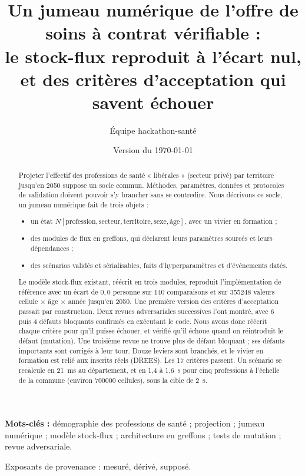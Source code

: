 \documentclass[11pt]{article}
\title{Un jumeau numérique de l'offre de soins à contrat vérifiable :\\
le stock-flux reproduit à l'écart nul, et des critères d'acceptation qui savent échouer}
\author[1]{Équipe hackathon-santé}
\affil[1]{Projet « jumeau numérique de l'offre de soins », dépôt \texttt{hackathon-sante/v2}}
\date{Version du \today}
\begin{document}
\maketitle

\begin{abstract}
Projeter l'effectif des professions de santé « libérales » (secteur privé) par territoire jusqu'en 2050
suppose un socle commun. Méthodes, paramètres, données et protocoles de validation doivent pouvoir s'y
brancher sans se contredire. Nous décrivons ce socle, un jumeau numérique fait de trois objets :
\begin{itemize}
  \item un état $N[\text{profession},\text{secteur},\text{territoire},\text{sexe},\text{âge}]$, avec un
        vivier en formation ;
  \item des modules de flux en greffons, qui déclarent leurs paramètres sourcés et leurs dépendances ;
  \item des scénarios validés et sérialisables, faits d'hyperparamètres et d'événements datés.
\end{itemize}
Le modèle stock-flux existant, réécrit en trois modules, reproduit l'implémentation de référence avec
un écart de $0{,}0$\mesure{} personne sur 140\mesure{} comparaisons et sur
\num{355248}\mesure{} valeurs cellule $\times$ âge $\times$ année jusqu'en 2050. Une première version
des critères d'acceptation passait par construction. Deux revues adversariales successives l'ont
montré, avec 6\mesure{} puis 4\mesure{} défauts bloquants confirmés en exécutant le code. Nous avons
donc réécrit chaque critère pour qu'il puisse échouer, et vérifié qu'il échoue quand on réintroduit
le défaut (mutation). Une troisième revue ne trouve plus de défaut bloquant ; ses défauts importants
sont corrigés à leur tour. Douze leviers sont branchés, et le vivier en formation est relié aux
inscrits réels (DREES). Les 17\mesure{} critères passent. Un scénario se recalcule en 21\mesure{}~ms au
département, et en 1,4 à 1,6\mesure{}~s pour cinq professions à l'échelle de la commune (environ
\num{700000} cellules), sous la cible de 2\suppose{}~s.
\end{abstract}
\noindent\textbf{Mots-clés :} démographie des professions de santé ; projection ; jumeau numérique ;
modèle stock-flux ; architecture en greffons ; tests de mutation ; revue adversariale.

\noindent\small Exposants de provenance : \mesure{} mesuré, \derive{} dérivé, \suppose{} supposé.\normalsize
\end{document}
